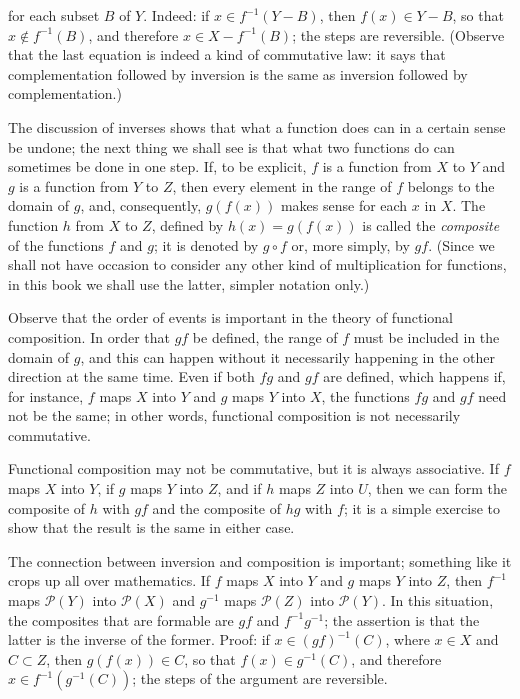 for each subset $B$ of $Y$. Indeed: if $x \in f^{-1}(Y - B)$, then $f(x) \in Y - B$, so that $x \notin f^{-1}(B)$, and therefore $x \in X - f^{-1}(B)$; the steps are reversible. (Observe that the last equation is indeed a kind of commutative law: it says that complementation followed by inversion is the same as inversion followed by complementation.) 

The discussion of inverses shows that what a function does can in a certain sense be undone; the next thing we shall see is that what two functions do can sometimes be done in one step. If, to be explicit, $f$ is a function from $X$ to $Y$ and $g$ is a function from $Y$ to $Z$, then every element in the range of $f$ belongs to the domain of $g$, and, consequently, $g(f(x))$ makes sense for each $x$ in $X$. The function $h$ from $X$ to $Z$, defined by $h(x) = g(f(x))$ is called the \textit{composite} of the functions $f$ and $g$; it is denoted by $g \circ f$ or, more simply, by $gf$. (Since we shall not have occasion to consider any other kind of multiplication for functions, in this book we shall use the latter, simpler notation only.) 

Observe that the order of events is important in the theory of functional composition. In order that $gf$ be defined, the range of $f$ must be included in the domain of $g$, and this can happen without it necessarily happening in the other direction at the same time. Even if both $fg$ and $gf$ are defined, which happens if, for instance, $f$ maps $X$ into $Y$ and $g$ maps $Y$ into $X$, the functions $fg$ and $gf$ need not be the same; in other words, functional composition is not necessarily commutative. 

Functional composition may not be commutative, but it is always associative. If $f$ maps $X$ into $Y$, if $g$ maps $Y$ into $Z$, and if $h$ maps $Z$ into $U$, then we can form the composite of $h$ with $gf$ and the composite of $hg$ with $f$; it is a simple exercise to show that the result is the same in either case. 

The connection between inversion and composition is important; something like it crops up all over mathematics. If $f$ maps $X$ into $Y$ and $g$ maps $Y$ into $Z$, then $f^{-1}$ maps $\mathcal{P}(Y)$ into $\mathcal{P}(X)$ and $g^{-1}$ maps $\mathcal{P}(Z)$ into $\mathcal{P}(Y)$. In this situation, the composites that are formable are $gf$ and $f^{-1}g^{-1}$; the assertion is that the latter is the inverse of the former. Proof: if $x \in (gf)^{-1}(C)$, where $x \in X$ and $C \subset Z$, then $g(f(x)) \in C$, so that $f(x) \in g^{-1}(C)$, and therefore $x \in f^{-1}(g^{-1}(C))$; the steps of the argument are reversible. 

